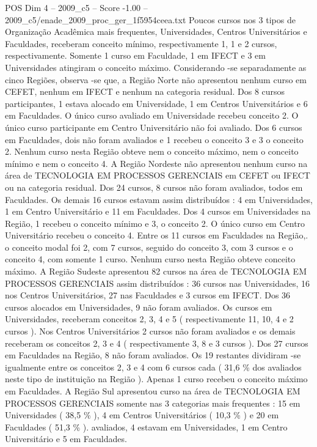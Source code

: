 \begin{textsample}{POS Dim 4 – 2009\_c5 – Score -1.00 – 2009\_c5/enade\_2009\_proc\_ger\_1f5954ceea.txt}
Poucos cursos nos 3 tipos de Organização Acadêmica mais frequentes, Universidades, Centros Universitários e Faculdades, receberam conceito mínimo, respectivamente 1, 1 e 2 cursos, respectivamente.
Somente 1 curso em Faculdade, 1 em IFECT e 3 em Universidades atingiram o conceito máximo.
Considerando -se separadamente as cinco Regiões, observa -se que, a Região Norte não apresentou nenhum curso em CEFET, nenhum em IFECT e nenhum na categoria residual.
Dos 8 cursos participantes, 1 estava alocado em Universidade, 1 em Centros Universitários e 6 em Faculdades.
O único curso avaliado em Universidade recebeu conceito 2.
O único curso participante em Centro Universitário não foi avaliado.
Dos 6 cursos em Faculdades, dois não foram avaliados e 1 recebeu o conceito 3 e 3 o conceito 2.
Nenhum curso nesta Região obteve nem o conceito máximo, nem o conceito mínimo e nem o conceito 4.
A Região Nordeste não apresentou nenhum curso na área de TECNOLOGIA EM PROCESSOS GERENCIAIS em CEFET ou IFECT ou na categoria residual.
Dos 24 cursos, 8 cursos não foram avaliados, todos em Faculdades.
Os demais 16 cursos estavam assim distribuídos : 4 em Universidades, 1 em Centro Universitário e 11 em Faculdades.
Dos 4 cursos em Universidades na Região, 1 recebeu o conceito mínimo e 3, o conceito 2.
O único curso em Centro Universitário recebeu o conceito 4.
Entre os 11 cursos em Faculdades na Região,. o conceito modal foi 2, com 7 cursos, seguido do conceito 3, com 3 cursos e o conceito 4, com somente 1 curso.
Nenhum curso nesta Região obteve conceito máximo.
A Região Sudeste apresentou 82 cursos na área de TECNOLOGIA EM PROCESSOS GERENCIAIS assim distribuídos : 36 cursos nas Universidades, 16 nos Centros Universitários, 27 nas Faculdades e 3 cursos em IFECT.
Dos 36 cursos alocados em Universidades, 9 não foram avaliados.
Os cursos em Universidades, receberam conceitos 2, 3, 4 e 5 ( respectivamente 11, 10, 4 e 2 cursos ).
Nos Centros Universitários 2 cursos não foram avaliados e os demais receberam os conceitos 2, 3 e 4 ( respectivamente 3, 8 e 3 cursos ).
Dos 27 cursos em Faculdades na Região, 8 não foram avaliados.
Os 19 restantes dividiram -se igualmente entre os conceitos 2, 3 e 4 com 6 cursos cada ( 31,6 \% dos avaliados neste tipo de instituição na Região ).
Apenas 1 curso recebeu o conceito máximo em Faculdades.
A Região Sul apresentou curso na área de TECNOLOGIA EM PROCESSOS GERENCIAIS somente nas 3 categorias mais frequentes : 15 em Universidades ( 38,5 \% ), 4 em Centros Universitários ( 10,3 \% ) e 20 em Faculdades ( 51,3 \% ). avaliados, 4 estavam em Universidades, 1 em Centro Universitário e 5 em Faculdades.

\end{textsample}
